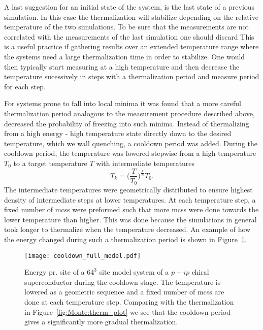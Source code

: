 A last suggestion for an initial state of the system,
is the last state of a previous simulation. In this case the thermalization will stabilize depending on the relative temperature
of the two simulations. To be sure that the measurements are not correlated with the measurements of the last simulation one should discard
This is a useful practice if gathering results over an extended temperature range where the systems need a large
thermalization time in order to stabilize. One would then typically start measuring at a high temperature and then decrease the temperature
sucessively in steps with a thermalization period and measure period for each step.

For systems prone to fall into local minima it was found that a more careful thermalization period analogous to the measurement procedure 
described above, decreased the probability of freezing into such minima. Instead of thermalizing from a high energy - high temperature state
directly down to the desired temperature, which we wall quenching, a cooldown period was added. During the cooldown period, the temperature was
lowered stepwise from a high temperature $T_0$ to a target temperature $T$ with intermediate temperatures
\begin{equation}
    \label{eq:Monte:Therm:geometricTemperatures}
    T_k = \Big(\frac{T}{T_0}\Big)^{\frac{k}{N}}T_0.
\end{equation}
The intermediate temperatures were geometrically distributed to ensure highest density of intermediate steps at lower temperatures. At
each temperature step, a fixed number of \ac{mcs}s were preformed such that more \ac{mcs}s were done towards the lower temperature than
higher. This was done because the simulations in general took longer to thermalize when the temperature decreased. An example of how the
energy changed during such a thermalization period is shown in Figure~\ref{fig:Monte:cooldown_plot}.

\begin{figure}[t]
    \centering
    \texttt{[image: cooldown\_full\_model.pdf]}
    \caption{Energy pr. site of a $64^3$ site model system of a $p+ip$ chiral superconductor during the cooldown stage. The temperature is
    lowered as a geometric sequence and a fixed number of \ac{mcs}s are done at each temperature step. Comparing with the thermalization
    in Figure~\ref{fig:Monte:therm_plot} we see that the cooldown period gives a significantly more gradual thermalization.}
    \label{fig:Monte:cooldown_plot}
\end{figure}

